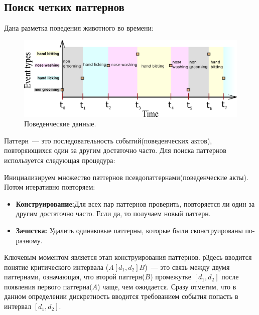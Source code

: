 \documentclass[12pt]{article}
\begin{document}
\subsection{Поиск четких паттернов}
Дана разметка поведения животного во времени:
\begin{figure}[H]
	\noindent
	\begin{flushleft}
	\includegraphics[scale=0.65]{beh_data.eps}
	\end{flushleft}
	\caption{Поведенческие данные.}
\end{figure}

Паттерн~--- это последовательность событий(поведенческих актов), повторяющихся один за другим 
достаточно часто. Для поиска паттернов используется следующая процедура:

Инициализируем множество паттернов псевдопаттернами(поведенческие акты). Потом итеративно повторяем:
  \begin{itemize}
   \item {\bf Конструирование:}Для всех пар паттернов проверить, повторяется ли один за другим достаточно часто. Если да, 
	то получаем новый паттерн.
   \item {\bf Зачистка:} Удалить одинаковые паттерны, которые были сконструированы по-разному.
  \end{itemize}

Ключевым моментом является этап конструирования паттернов. рЗдесь вводится понятие
критического интервала ($A[d_1,d_2]B$)~--- это связь между двумя паттернами, означающая, 
что второй паттерн($B$) промежутке $[d_1,d_2]$ после появления первого паттерна($A$) 
чаще, чем ожидается. Сразу отметим, что в данном определении дискретность вводится
требованием события попасть в интервал $[d_1,d_2]$.
\end{document}
